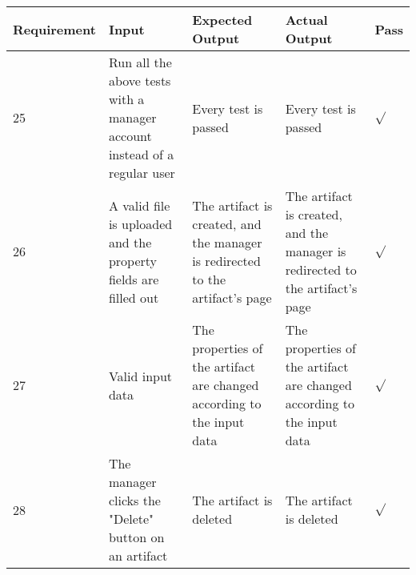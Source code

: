 {\centering
\scalebox{0.7}
{\begin{tabular}{ | p{2cm} | p{3cm} | p{4cm} | p{4cm} | p{0.5cm} | }
	\hline
	Requirement & Input & Expected Output & Actual Output & Pass \\
	\hline
	25 & Run all the above tests with a manager account instead of a regular user & Every test is passed & Every test is passed & $\sqrt{}$ \\
	\hline
	26 & A valid file is uploaded and the property fields are filled out & The artifact is created, and the manager is redirected to the artifact's page & The artifact is created, and the manager is redirected to the artifact's page & $\sqrt{}$ \\
	\hline
	27 & Valid input data & The properties of the artifact are changed according to the input data & The properties of the artifact are changed according to the input data & $\sqrt{}$ \\
	\hline
	28 & The manager clicks the "Delete" button on an artifact & The artifact is deleted & The artifact is deleted & $\sqrt{}$ \\
	\hline
\end{tabular}}}
